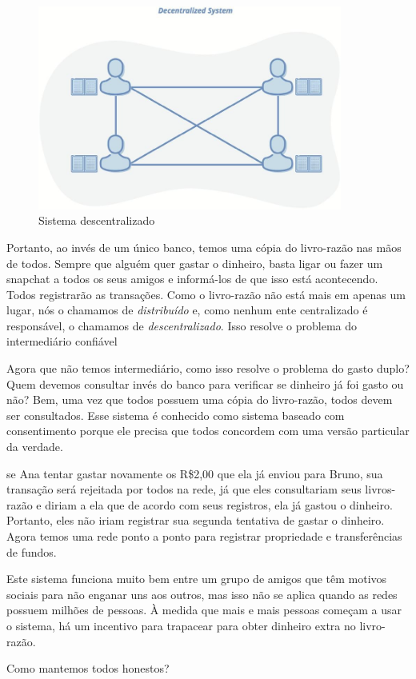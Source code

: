 ~

\begin{figure}
  \centering
  \includegraphics[width=10cm]{imagens/descentralizado-capitulo-02.jpg}
  \caption{Sistema descentralizado}
\end{figure}
\newpage

Portanto, ao invés de um único banco, temos uma cópia do livro-razão nas mãos de todos. Sempre que alguém quer gastar o dinheiro, basta ligar ou fazer um snapchat a todos os seus amigos e informá-los de que isso está acontecendo. Todos registrarão as transações. Como o livro-razão não está mais em apenas um lugar, nós o chamamos de \textit{distribuído} e, como nenhum ente centralizado é responsável, o chamamos de \textit{descentralizado}.
Isso resolve o problema do intermediário confiável

Agora que não temos intermediário, como isso resolve o problema do gasto duplo? Quem devemos consultar invés do banco para verificar se dinheiro já foi gasto ou não? Bem, uma vez que todos possuem uma cópia do livro-razão, todos devem ser consultados. Esse sistema é conhecido como sistema baseado com consentimento porque ele precisa que todos concordem com uma versão particular da verdade.%

se Ana tentar gastar novamente os R\$2,00 que ela já enviou para Bruno, sua transação será rejeitada por todos na rede, já que eles consultariam seus livros-razão e diriam a ela que de acordo com seus registros, ela já gastou o dinheiro.
Portanto, eles não iriam registrar sua segunda tentativa de gastar o dinheiro. Agora temos uma rede ponto a ponto para registrar propriedade e transferências de fundos.

Este sistema funciona muito bem entre um grupo de amigos que têm motivos sociais para não enganar uns aos outros, mas isso não se aplica quando as redes possuem milhões de pessoas. 
À medida que mais e mais pessoas começam a usar o sistema, há um incentivo para trapacear para obter dinheiro extra no livro-razão.

Como mantemos todos honestos?